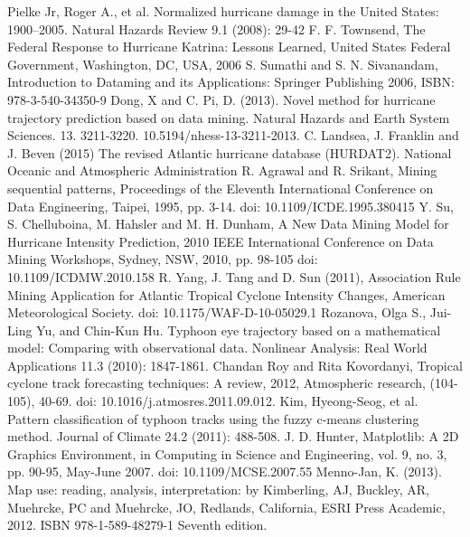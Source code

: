 \documentclass[12pt,conference]{IEEEtran}
\begin{document}
\begin{thebibliography}{1}
 Pielke Jr, Roger A., et al. Normalized hurricane damage in the United States: 1900–2005. Natural Hazards Review 9.1 (2008): 29-42
 F. F. Townsend, The Federal Response to Hurricane Katrina: Lessons Learned, United States Federal Government, Washington, DC, USA, 2006
 S. Sumathi and S. N. Sivanandam, Introduction to Dataming and its Applications: Springer Publishing 2006, ISBN: 978-3-540-34350-9
 Dong, X and C. Pi, D. (2013). Novel method for hurricane trajectory prediction based on data mining. Natural Hazards and Earth System Sciences. 13. 3211-3220. 10.5194/nhess-13-3211-2013. 
 C. Landsea, J. Franklin and J. Beven (2015) The revised Atlantic hurricane database (HURDAT2). National Oceanic and Atmospheric Administration
 R. Agrawal and R. Srikant, Mining sequential patterns, Proceedings of the Eleventh International Conference on Data Engineering, Taipei, 1995, pp. 3-14.
doi: 10.1109/ICDE.1995.380415
 Y. Su, S. Chelluboina, M. Hahsler and M. H. Dunham, A New Data Mining Model for Hurricane Intensity Prediction, 2010 IEEE International Conference on Data Mining Workshops, Sydney, NSW, 2010, pp. 98-105
doi: 10.1109/ICDMW.2010.158
 R. Yang, J. Tang and D. Sun (2011), Association Rule Mining Application for Atlantic Tropical Cyclone Intensity Changes, American Meteorological Society. doi: 10.1175/WAF-D-10-05029.1
 Rozanova, Olga S., Jui-Ling Yu, and Chin-Kun Hu. Typhoon eye trajectory based on a mathematical model: Comparing with observational data. Nonlinear Analysis: Real World Applications 11.3 (2010): 1847-1861.
 Chandan Roy and Rita Kovordanyi, Tropical cyclone track forecasting techniques: A review, 2012, Atmospheric research, (104-105), 40-69. doi: 10.1016/j.atmosres.2011.09.012.
 Kim, Hyeong-Seog, et al. Pattern classification of typhoon tracks using the fuzzy c-means clustering method. Journal of Climate 24.2 (2011): 488-508.
 J. D. Hunter, Matplotlib: A 2D Graphics Environment, in Computing in Science and Engineering, vol. 9, no. 3, pp. 90-95, May-June 2007.
doi: 10.1109/MCSE.2007.55
 Menno-Jan, K. (2013). Map use: reading, analysis, interpretation: by Kimberling, AJ, Buckley, AR, Muehrcke, PC and Muehrcke, JO, Redlands, California, ESRI Press Academic, 2012. ISBN 978-1-589-48279-1 Seventh edition.

\end{thebibliography}
\end{document}
